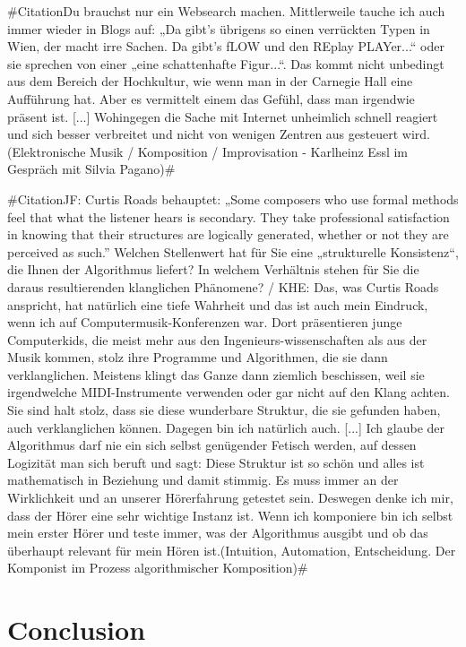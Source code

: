 \documentclass[a4paper,12pt]{article}
\newcommand{\zitat}[2]{\#Citation#1(#2)\#}
\begin{document}
\zitat{Du brauchst nur ein Websearch machen. Mittlerweile tauche ich auch immer wieder in Blogs auf: „Da gibt’s übrigens so einen verrückten Typen in Wien, der macht irre Sachen. Da gibt’s fLOW und den REplay PLAYer...“ oder sie sprechen von einer „eine schattenhafte Figur...“. Das kommt nicht unbedingt aus dem Bereich der Hochkultur, wie wenn man in der Carnegie Hall eine Aufführung hat. Aber es vermittelt einem das Gefühl, dass man irgendwie präsent ist. [...] Wohingegen die Sache mit Internet unheimlich schnell reagiert und sich besser verbreitet und nicht von wenigen Zentren aus gesteuert wird.}
{Elektronische Musik / Komposition / Improvisation - Karlheinz Essl im Gespräch mit Silvia Pagano}

\zitat{JF: Curtis Roads behauptet: „Some composers who use formal methods feel that what the listener hears is secondary. They take professional satisfaction in knowing that their structures are logically generated, whether or not they are perceived as such.” Welchen Stellenwert hat für Sie eine „strukturelle Konsistenz“, die Ihnen der Algorithmus liefert? In welchem Verhältnis stehen für Sie die daraus resultierenden klanglichen Phänomene? / KHE: Das, was Curtis Roads anspricht, hat natürlich eine tiefe Wahrheit und das ist auch mein Eindruck, wenn ich auf Computermusik-Konferenzen war. Dort präsentieren junge Computerkids, die meist mehr aus den Ingenieurs-wissenschaften als aus der Musik kommen, stolz ihre Programme und Algorithmen, die sie dann verklanglichen. Meistens klingt das Ganze dann ziemlich beschissen, weil sie irgendwelche MIDI-Instrumente verwenden oder gar nicht auf den Klang achten. Sie sind halt stolz, dass sie diese wunderbare Struktur, die sie gefunden haben, auch verklanglichen können. Dagegen bin ich natürlich auch. [...] Ich glaube der Algorithmus darf nie ein sich selbst genügender Fetisch werden, auf dessen Logizität man sich beruft und sagt: Diese Struktur ist so schön und alles ist mathematisch in Beziehung und damit stimmig. Es muss immer an der Wirklichkeit und an unserer Hörerfahrung getestet sein. Deswegen denke ich mir, dass der Hörer eine sehr wichtige Instanz ist. Wenn ich komponiere bin ich selbst mein erster Hörer und teste immer, was der Algorithmus ausgibt und ob das überhaupt relevant für mein Hören ist.}
{Intuition, Automation, Entscheidung. Der Komponist im Prozess algorithmischer Komposition}

\section{Conclusion}
\end{document}
